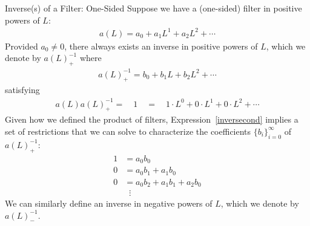 \documentclass[aspectratio=169, handout]{beamer}
\begin{document}
{\scriptsize
\begin{frame}{Inverse(s) of a Filter: One-Sided}
Suppose we have a (one-sided) filter in positive powers of $L$:
\begin{align*}
  a(L) = a_0 + a_1 L^1 + a_2 L^2 + \cdots
\end{align*}
Provided $a_0\neq 0$, there \alert{always} exists an inverse in
\alert{positive} powers of $L$, which we denote by $a(L)^{-1}_+$
where
\begin{align*}
  a(L)^{-1}_+ = b_0 + b_1 L + b_2 L^2 + \cdots
\end{align*}
\pause
satisfying
\begin{align}
  a(L)a(L)^{-1}_+
  =
  \quad
  1
  \quad
  =
  \quad
  1\cdot L^0 + 0 \cdot L^1 + 0 \cdot L^2 + \cdots
  \label{inversecond}
\end{align}
\pause
Given how we defined the product of filters,
Expression~\ref{inversecond} implies a \alert{set of restrictions} that
we can solve to characterize the coefficients $\{b_i\}_{i=0}^\infty$ of
$a(L)^{-1}_+$:
\begin{align*}
  1 &= a_0 b_0
  \\
  0 &= a_0 b_1 + a_1 b_0
  \\
  0 &= a_0 b_2 + a_1 b_1 + a_2 b_0
  \\
  &\;\;\vdots
\end{align*}
\pause
We can similarly define an inverse in \alert{negative} powers of $L$,
which we denote by $a(L)_-^{-1}$.
\end{frame}
}
\end{document}
